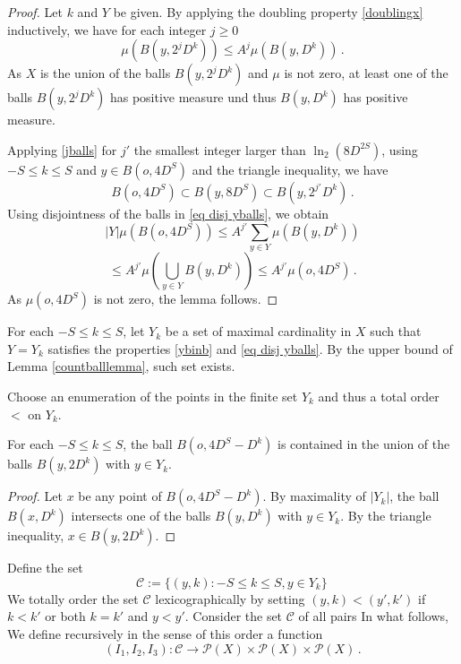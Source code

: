 \begin{proof}
    Let $k$ and $Y$ be given.
    By applying the doubling property \eqref{doublingx} inductively, we have for each integer $j\ge 0$
    \begin{equation}\label{jballs}
        \mu(B(y,2^{j}D^k))\le A^j \mu(B(y,D^k))\, .
    \end{equation}
    As $X$ is the union of the balls $B(y,2^{j}D^k)$ and $\mu$ is not zero, at least one of
    the balls $B(y,2^{j}D^k)$ has positive measure und thus $B(y,D^k)$ has positive measure.

    Applying \eqref{jballs} for $j'$ the smallest integer larger than $\ln_2(8D^{2S})$, using $-S\le k\le S$
    and $y\in B(o,4D^S)$ and the triangle inequality, we have
    \begin{equation}
        B(o, 4D^S) \subset B(y, 8D^S) \subset B(y,2^{j'}D^k) \, .
    \end{equation}
Using disjointness of the balls in \eqref{eq disj yballs}, we obtain
\begin{equation}
|Y|\mu(B(o,4D^S))\le A^{j'}\sum_{y\in Y}\mu(B(y,D^k))
\end{equation}
\begin{equation}
\le
A^{j'}\mu(\bigcup_{y\in Y}B(y,D^k))
\le A^{j'}\mu(o,4D^S)\, .
\end{equation}
As $\mu(o,4D^S)$ is not zero, the lemma follows.
\end{proof}

For each $-S\le k\le S$, let $Y_k$ be a set of
maximal cardinality in $X$ such that $Y=Y_k$ satisfies
the properties \eqref{ybinb} and \eqref{eq disj yballs}.
By the upper bound of Lemma \ref{countballlemma}, such set exists.

Choose an enumeration of the points in the finite set $Y_k$ and thus a total
order  $<$ on $Y_{k}$.

\begin{lemma}\label{ballcover}
    For each $-S\le k\le S$, the ball
    $B(o, 4D^S-D^k)$ is contained
    in the union of the balls $B(y,2D^k)$ with $y\in Y_k$.
\end{lemma}

\begin{proof}
Let $x$ be any point of $B(o, 4D^S-D^k)$.   By maximality of $|Y_k|$, the ball
$B(x,  D^k)$ intersects one of the balls
$B(y,  D^k)$ with $y\in Y_k$. By the triangle
inequality, $x\in B(y,2D^k)$.
\end{proof}

Define the set
\begin{equation}
    \mathcal{C}:= \{(y,k): -S\le k\le S, y\in Y_k\}\,
\end{equation}
We totally order the set $\mathcal{C}$ lexicographically by setting
$(y,k)<(y',k')$ if $k< k'$ or both $k=k'$ and $y<y'$.
Consider the set $\mathcal{C}$ of all pairs
In what follows, We define recursively in the sense of this order a function
\begin{equation}
    (I_1,I_2,I_3): \mathcal{C}\to \mathcal{P}(X)\times \mathcal{P}(X)\times \mathcal{P}(X)\, .
\end{equation}


